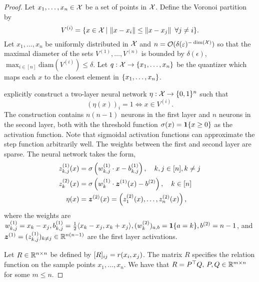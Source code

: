 \begin{proof}
    Let $x_1, \ldots, x_n \in {\mathcal{X}}$ be a set of points in ${\mathcal{X}}$. Define the Voronoi partition by
    \[V^{(i)} = \{x \in {\mathcal{X}} \,|\, \left\lVert x - x_i\right\rVert \leq \left\lVert x - x_j\right\rVert \ \forall j \neq i\}.\]
    Let $x_1, \ldots, x_n$ be uniformly distributed in ${\mathcal{X}}$ and $n = {\mathcal{O}}(\delta(\varepsilon)^{- \dim({\mathcal{X}})})$ so that the maximal diameter of the sets $V^{(1)}, \ldots, V^{(n)}$ is bounded by $\delta(\epsilon)$, $\max_{i \in [n]} \mathrm{diam}(V^{(i)}) \leq \delta$. Let $q: {\mathcal{X}} \to \{x_1, \ldots, x_n\}$ be the quantizer which maps each $x$ to the closest element in $\{x_1, \ldots, x_n\}$.

    \citet{wuExplicitNeuralNetwork2018} explicitly construct a two-layer neural network $\eta:{\mathcal{X}} \to \{0, 1\}^{n}$ such that
    \[{(\eta(x))}_i = 1 \iff x \in V^{(i)}.\]
    The construction contains $n (n - 1)$ neurons in the first layer and $n$ neurons in the second layer, both with the threshold function $\sigma(x) = \bm{1}\{x \geq 0\}$ as the activation function. Note that sigmoidal activation functions can approximate the step function arbitrarily well. The weights between the first and second layer are sparse. The neural network takes the form,
    \begin{equation*}
        \begin{aligned}
            z_{k,j}^{(1)}(x) &= \sigma\paren{w_{k,j}^{(1)} \cdot x - b_{k,j}^{(1)}}, \quad k,j \in [n], k \neq j\\
            z_k^{(2)}(x) &= \sigma\paren{w_k^{(1)} \cdot \bm{z}^{(1)}(x) - b^{(2)}}, \quad k \in [n] \\
            \eta(x) &= \bm{z}^{(2)}(x) = \paren{z_1^{(2)}(x), \ldots, z_n^{(2)}(x)},
        \end{aligned}
    \end{equation*}
    where the weights are $w_{k,j}^{(1)} = x_k - x_j, b_{k,j}^{(1)} = \frac{1}{2} \langle x_k - x_j, x_k + x_j \rangle, (w_{k}^{(2)})_{a,b} = \bm{1}\{a = k\}, b^{(2)} = n - 1$, and $\bm{z}^{(1)} = (z_{k,j}^{(1)})_{k \neq j} \in \mathbb{R}^{n (n - 1)}$ are the first layer activations.

    Let $R \in \mathbb{R}^{n \times n}$ be defined by $[R]_{ij} = r(x_i, x_j)$. The matrix $R$ specifies the relation function on the sample points $x_1, \ldots, x_n$. We have that $R = P^\top Q,\, P,Q \in \mathbb{R}^{m \times n}$ for some $m \leq n$. 


\end{proof}

